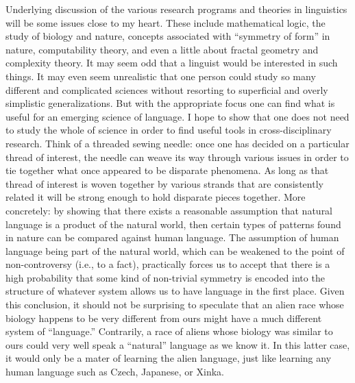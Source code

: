 \documentclass[11pt]{book}%
\theoremstyle{plain}
\numberwithin{equation}{section}
\theoremstyle{definition}
\newtheorem{phrase string}{Phrase String}
\begin{document}
Underlying discussion of the various research programs and theories in linguistics will be some issues close to my heart. These include mathematical logic, the study of biology and nature, concepts associated with ``symmetry of form'' in nature, computability theory, and even a little about fractal geometry and complexity theory. It may seem odd that a linguist would be interested in such things. It may even seem unrealistic that one person could study so many different and complicated sciences without resorting to superficial and overly simplistic generalizations. But with the appropriate focus one can find what is useful for an emerging science of language. I hope to show that one does not need to study the whole of science in order to find useful tools in cross-disciplinary research. Think of a threaded sewing needle: once one has decided on a particular thread of interest, the needle can weave its way through various issues in order to tie together what once appeared to be disparate phenomena. As long as that thread of interest is woven together by various strands that are consistently related it will be strong enough to hold disparate pieces together. More concretely: by showing that there exists a reasonable assumption that natural language is a product of the natural world, then certain types of patterns found in nature can be compared against human language. The assumption of human language being part of the natural world, which can be weakened to the point of non-controversy (i.e., to a fact), practically forces us to accept that there is a high probability that some kind of non-trivial symmetry is encoded into the structure of whatever system allows us to have language in the first place. Given this conclusion, it should not be surprising to speculate that an alien race whose biology happens to be very different from ours might have a much different system of ``language.'' Contrarily, a race of aliens whose biology was similar to ours could very well speak a ``natural'' language as we know it. In this latter case, it would only be a mater of learning the alien language, just like learning any human language such as Czech, Japanese, or Xinka.
\end{document}
